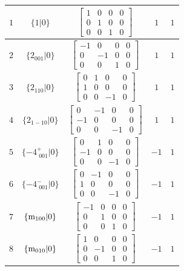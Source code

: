 \documentclass[fleqn,8pt]{jsarticle}
\begin{document}
\begin{longtable}{ccccc}
$ 1 $ & $ \{1|0\} $ & $ \begin{bmatrix} 1 & 0 & 0 & 0 \\ 0 & 1 & 0 & 0 \\ 0 & 0 & 1 & 0 \end{bmatrix} $ & $ 1 $ & $ 1 $ \\ \hline
$ 2 $ & $ \{2{}_{001}|0\} $ & $ \begin{bmatrix} -1 & 0 & 0 & 0 \\ 0 & -1 & 0 & 0 \\ 0 & 0 & 1 & 0 \end{bmatrix} $ & $ 1 $ & $ 1 $ \\ \hline
$ 3 $ & $ \{2{}_{110}|0\} $ & $ \begin{bmatrix} 0 & 1 & 0 & 0 \\ 1 & 0 & 0 & 0 \\ 0 & 0 & -1 & 0 \end{bmatrix} $ & $ 1 $ & $ 1 $ \\ \hline
$ 4 $ & $ \{2{}_{1-10}|0\} $ & $ \begin{bmatrix} 0 & -1 & 0 & 0 \\ -1 & 0 & 0 & 0 \\ 0 & 0 & -1 & 0 \end{bmatrix} $ & $ 1 $ & $ 1 $ \\ \hline
$ 5 $ & $ \{-4^{+}_{\,\,001}|0\} $ & $ \begin{bmatrix} 0 & 1 & 0 & 0 \\ -1 & 0 & 0 & 0 \\ 0 & 0 & -1 & 0 \end{bmatrix} $ & $ -1 $ & $ 1 $ \\ \hline
$ 6 $ & $ \{-4^{-}_{\,\,001}|0\} $ & $ \begin{bmatrix} 0 & -1 & 0 & 0 \\ 1 & 0 & 0 & 0 \\ 0 & 0 & -1 & 0 \end{bmatrix} $ & $ -1 $ & $ 1 $ \\ \hline
$ 7 $ & $ \{{\rm m}_{100}|0\} $ & $ \begin{bmatrix} -1 & 0 & 0 & 0 \\ 0 & 1 & 0 & 0 \\ 0 & 0 & 1 & 0 \end{bmatrix} $ & $ -1 $ & $ 1 $ \\ \hline
$ 8 $ & $ \{{\rm m}_{010}|0\} $ & $ \begin{bmatrix} 1 & 0 & 0 & 0 \\ 0 & -1 & 0 & 0 \\ 0 & 0 & 1 & 0 \end{bmatrix} $ & $ -1 $ & $ 1 $ \\ \hline

\end{longtable}
\end{document}
